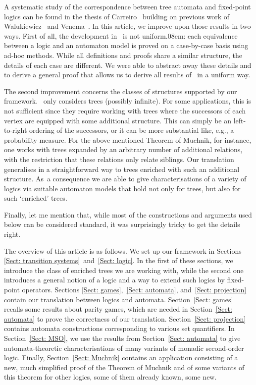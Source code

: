 \documentclass[10pt, fleqn]{scrartcl}
\newcommand*{\?}{\kern .08em}
\begin{document}
A systematic study of the correspondence between tree automata and fixed-point logics
can be found in the thesis of Carreiro~\cite{Carreiro15} building on previous work
of Walukiewicz~\cite{JaninWalukiewicz96,Walukiewicz02} and
Venema~\cite{Venema06,KupkeVenema08,KissigVenema09}.
In this article, we improve upon those results in two ways. First of all, the development
in~\cite{Carreiro15} is not uniform\?: each equivalence between a logic and an automaton model
is proved on a case-by-case basis using ad-hoc methods.
While all definitions and proofs share a similar structure, the details of each case
are different. We were able to abstract away these details and to derive a general proof
that allows us to derive all results of~\cite{Carreiro15} in a uniform way.

The second improvement concerns the classes of structures supported by our framework.
\cite{Carreiro15}~only considers trees (possibly infinite).
For some applications, this is not sufficient since they require working with trees
where the successors of each vertex are equipped with some additional structure.
This can simply be an left-to-right ordering of the successors,
or it can be more substantial like, e.g., a probability measure.
For the above mentioned Theorem of Muchnik, for instance, one works with trees
expanded by an arbitrary number of additional relations, with the restriction that
these relations only relate siblings.
Our translation generalises in a straightforward way to trees enriched with such an additional
structure. As~a consequence we are able to give characterisations of a variety of logics
via suitable automaton models that hold not only for trees, but also for such `enriched' trees.

Finally, let me mention that, while most of the constructions and arguments
used below can be considered standard, it was surprisingly tricky to get the details right.

The overview of this article is as follows.
We set up our framework in Sections \ref{Sect: transition systems}~and~\ref{Sect: logic}.
In the first of these sections, we introduce the class of enriched trees we are working with,
while the second one introduces a general notion of a logic and a way to extend such
logics by fixed-point operators.
Sections \ref{Sect: games},~\ref{Sect: automata}, and~\ref{Sect: projection} contain
our translation between logics and automata.
Section~\ref{Sect: games} recalls some results about parity games,
which are needed in Section~\ref{Sect: automata} to prove the correctness of our translation.
Section~\ref{Sect: projection} contains automata constructions corresponding to
various set quantifiers.
In Section~\ref{Sect: MSO}, we use the results from Section~\ref{Sect: automata}
to give automata-theoretic characterisations of many variants of monadic second-order logic.
Finally, Section~\ref{Sect: Muchnik} contains an application consisting of a new, much simplified
proof of the Theorem of Muchnik and of some variants of this theorem for other logics,
some of them already known, some new.
\end{document}
